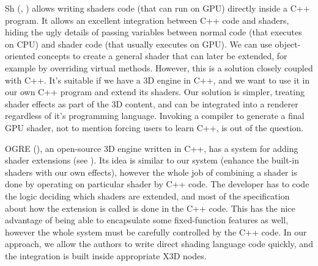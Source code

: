 \documentclass{egpubl}
\begin{document}


Sh (, \cite{sh:book})
allows writing shaders code (that can run on GPU) directly inside a
C++ program.
It allows an excellent
integration between C++ code and shaders, hiding the ugly details of
passing variables between normal code (that executes on CPU) and
shader code (that usually executes on GPU). We can use
object-oriented concepts to create a general shader that can
later be extended, for example by overriding virtual
methods. However, this is a solution closely coupled with C++. It's
suitable if we have a 3D engine in C++, and we want to use it in
our own C++ program and extend its shaders. Our solution is simpler,
treating shader effects as part of the 3D content, and can
be integrated into a renderer regardless of it's programming language.
Invoking a compiler to generate a
final GPU shader, not to mention forcing users to learn C++, is out of the
question.

OGRE (), an open-source 3D engine written in C++, has a system
for adding shader extensions (see \cite{ogre:shader}). Its idea is similar
to our system (enhance the built-in shaders with our own effects),
however the whole job of combining a shader is done by operating
on particular shader by C++ code. The developer has to code
the logic deciding which shaders are extended, and most of the specification
about how the extension is called is done in the C++ code.
This has the nice advantage of being able to encapsulate some fixed-function
features as well, however the whole system must be carefully controlled by
the C++ code. In our approach, we allow the authors to write direct shading
language code quickly, and the integration is built inside appropriate X3D nodes.
\end{document}
